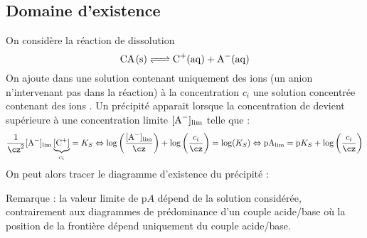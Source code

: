 \documentclass{cours}
\begin{document}
\subsection{Domaine d'existence}%
\label{sub:domaine_d_existence}
On considère la réaction de dissolution 
\begin{equation}
  \ce{CA(s) <=> C+(aq) + A-(aq)}
\end{equation}
On ajoute dans une solution contenant uniquement des ions  (un anion n'intervenant pas dans la réaction) à la concentration $c_i$ une solution concentrée contenant des ions . Un précipité apparait lorsque la concentration de  devient supérieure à une concentration limite $[\ce{A-}]_\text{lim}$ telle que : 
\begin{equation}
  \frac{1}{\cz^2}[\ce{A-}]_\text{lim}\underbrace{[\ce{C+}]}_{c_i} = K_S \Leftrightarrow
  \log \left( \frac{[\ce{A-}]_\text{lim}}{\cz} \right)  + \log\left( \frac{c_i}{\cz} \right)  = \log(K_S) \Leftrightarrow
  \mathrm{p}\ce{A}_\text{lim} = \pKs + \log\left( \frac{c_i}{\cz} \right) 
\end{equation}
%
On peut alors tracer le diagramme d'existence du précipité  :
\begin{center}
\end{center}

Remarque : la valeur limite de $\mathrm{p}A$ dépend de la solution considérée, contrairement aux diagrammes de prédominance d'un couple acide/base où la position de la frontière dépend uniquement du couple acide/base.
\end{document}
